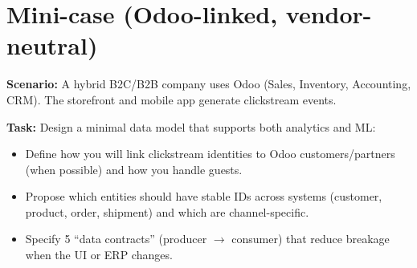 \section{Mini-case (Odoo-linked, vendor-neutral)}
\textbf{Scenario:} A hybrid B2C/B2B company uses Odoo (Sales, Inventory, Accounting, CRM). The storefront and mobile app generate clickstream events.

\textbf{Task:} Design a minimal data model that supports both analytics and ML:
\begin{itemize}
  \item Define how you will link clickstream identities to Odoo customers/partners (when possible) and how you handle guests.
  \item Propose which entities should have stable IDs across systems (customer, product, order, shipment) and which are channel-specific.
  \item Specify 5 ``data contracts'' (producer $\rightarrow$ consumer) that reduce breakage when the UI or ERP changes.
\end{itemize}
